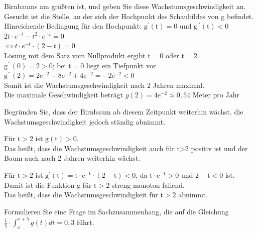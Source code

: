 \documentclass[10pt]{article}
\begin{document}
Birnbaums am größten ist, und geben Sie diese Wachstumsgeschwindigkeit an.\\
Gesucht ist die Stelle, an der sich der Hochpunkt des Schaubildes von g befindet.\\
Hinreichende Bedingung für den Hochpunkt: $\mathrm{g}^{\prime}(\mathrm{t})=0$ und $\mathrm{g}^{\prime \prime}(\mathrm{t})<0$\\
$2 t \cdot e^{-t}-t^{2} \cdot e^{-t}=0$\\
$\Leftrightarrow t \cdot e^{-t} \cdot(2-t)=0$\\
Lösung mit dem Satz vom Nullprodukt ergibt $\mathrm{t}=0$ oder $\mathrm{t}=2$\\
$\mathrm{g}^{\prime \prime}(0)=2>0$; bei $\mathrm{t}=0$ liegt ein Tiefpunkt vor\\
$\mathrm{g}^{\prime \prime}(2)=2 \mathrm{e}^{-2}-8 \mathrm{e}^{-2}+4 \mathrm{e}^{-2}=-2 \mathrm{e}^{-2}<0$\\
Somit ist die Wachstumsgeschwindigkeit nach 2 Jahren maximal.\\
Die maximale Geschwindigkeit beträgt $g(2)=4 \mathrm{e}^{-2} \approx 0,54$ Meter pro Jahr

Begründen Sie, dass der Birnbaum ab diesem Zeitpunkt weiterhin wächst, die Wachstumsgeschwindigkeit jedoch ständig abnimmt.

Für $\mathrm{t}>2$ ist $\mathrm{g}(\mathrm{t})>0$.\\
Das heißt, dass die Wachstumsgeschwindigkeit auch für t>2 positiv ist und der Baum auch nach 2 Jahren weiterhin wächst.

Für $\mathrm{t}>2$ ist $\mathrm{g}^{\prime}(\mathrm{t})=\mathrm{t} \cdot \mathrm{e}^{-\mathrm{t}} \cdot(2-\mathrm{t})<0$, da $\mathrm{t} \cdot \mathrm{e}^{-\mathrm{t}}>0$ und $2-\mathrm{t}<0$ ist.\\
Damit ist die Funktion g für $\mathrm{t}>2$ streng monoton fallend.\\
Das heißt, dass die Wachstumsgeschwindigkeit für $\mathrm{t}>2$ abnimmt.

Formulieren Sie eine Frage im Sachzusammenhang, die auf die Gleichung $\frac{1}{5} \cdot \int_{x}^{x+5} g(t) d t=0,3$ führt.
\end{document}
